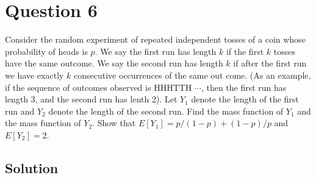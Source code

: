 \section*{Question 6}

Consider the random experiment of repeated independent tosses of a coin whose probability of heads is \( p \).
We say the first run has length \( k \) if the first \( k \) tosses have the same outcome.
We say the second run has length \( k \) if after the first run we have exactly \( k \) consecutive occurrences of the same out come.
(As an example, if the sequence of outcomes observed is HHHTTH \( \cdots \), then the first run has length 3, and the second run has lenth 2).
Let \( Y_{1} \) denote the length of the first run and \( Y_{2} \) denote the length of the second run.
Find the mass function of \( Y_{1} \) and the mass function of \( Y_{2} \).
Show that \( E\left[Y_{1}\right]=p /(1-p)+(1-p) / p \) and \( E\left[Y_{2}\right]=2 \).


\subsection*{Solution}
